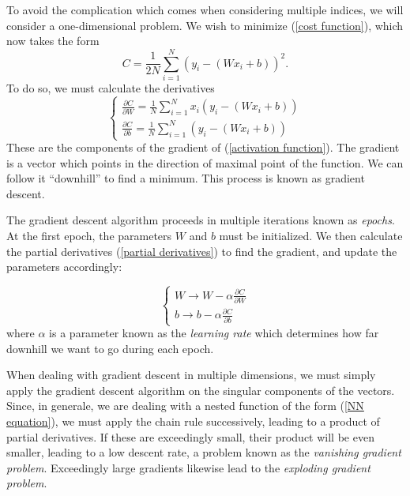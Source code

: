 \documentclass[10pt,a4paper]{book}
\begin{document}
To avoid the complication which comes when considering multiple indices, we will consider a one-dimensional problem. We wish to minimize (\ref{cost function}), which now takes the form
\begin{equation}
C = \frac{1}{2N}\sum_{i = 1}^N (y_i - (Wx_i + b))^2.
\end{equation}
To do so, we must calculate the derivatives
\begin{equation}
\begin{cases}
\frac{\partial C}{\partial W} = \frac{1}{N}\sum_{i = 1}^N x_i(y_i - (Wx_i + b)) \\
\frac{\partial C}{\partial b} = \frac{1}{N}\sum_{i = 1}^N (y_i - (Wx_i + b))
\end{cases}
\label{partial derivatives}
\end{equation}
These are the components of the gradient of (\ref{activation function}). The gradient is a vector which points in the direction of maximal point of the function. We can follow it ``downhill'' to find a minimum. This process is known as gradient descent. 

The gradient descent algorithm proceeds in multiple iterations known as \emph{epochs}. At the first epoch, the parameters $W$ and $b$ must be initialized. We then calculate the partial derivatives (\ref{partial derivatives}) to find the gradient, and update the parameters accordingly:

\begin{equation}
\begin{cases}
W \rightarrow W - \alpha\frac{\partial C}{\partial W} \\
b \rightarrow b - \alpha\frac{\partial C}{\partial b}
\end{cases}
\end{equation}
where $\alpha$ is a parameter known as the \emph{learning rate} which determines how far downhill we want to go during each epoch.

When dealing with gradient descent in multiple dimensions, we must simply apply the gradient descent algorithm on the singular components of the vectors. Since, in generale, we are dealing with a nested function of the form (\ref{NN equation}), we must apply the chain rule successively, leading to a product of partial derivatives. If these are exceedingly small, their product will be even smaller, leading to a low descent rate, a problem known as the \emph{vanishing gradient problem}. Exceedingly large gradients likewise lead to the \emph{exploding gradient problem}. 
\end{document}
